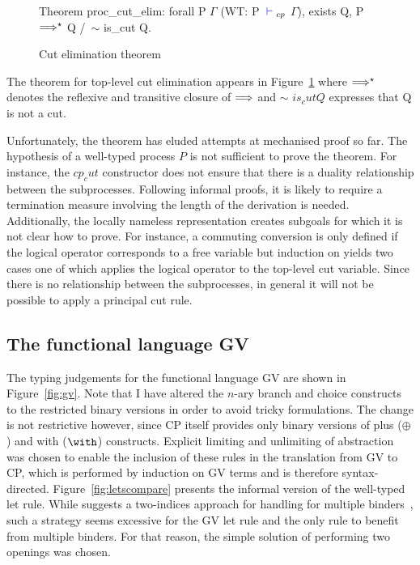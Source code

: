 \begin{figure}
\begin{coq}
Theorem proc_cut_elim:
  forall P $\Gamma$
         (WT: P ${\color{blue} {} \vdash {}}_{cp}$ $\Gamma$),
    exists Q, P $\Longrightarrow^\star$ Q /\ $\sim$ is_cut Q.
\end{coq}
\caption{Cut elimination theorem}
\label{fig:cutelim}
\end{figure}

The theorem for top-level cut elimination appears in Figure~\ref{fig:cutelim}
where $\Longrightarrow^\star$ denotes the reflexive and transitive closure of
$\Longrightarrow$ and $\sim$ \coqe$is_cut Q$ expresses that Q is not a cut.

Unfortunately, the theorem has eluded attempts at mechanised proof so far. The
hypothesis of a well-typed process \coqe$P$ is not sufficient to prove the
theorem. For instance, the \coqe$cp_cut$ constructor does not ensure that
there is a duality relationship between the subprocesses. Following informal
proofs, it is likely to require a termination measure involving the length of
the derivation is needed. Additionally, the locally nameless representation
creates subgoals for which it is not clear how to prove. For instance, a
commuting conversion is only defined if the logical operator corresponds to a
free variable but induction on  yields two cases one of which applies
the logical operator to the top-level cut variable. Since there is no
relationship between the subprocesses, in general it will not be possible to
apply a principal cut rule.

\subsection{The functional language GV}\label{sec:gv}




The typing judgements for the functional language GV are shown in
Figure~\ref{fig:gv}. Note that I have altered the $n$-ary branch and choice
constructs to the restricted binary versions in order to avoid tricky
formulations. The change is not restrictive however, since CP itself provides
only binary versions of plus ($\oplus$) and with ($\with$)
constructs. Explicit limiting and unlimiting of abstraction was chosen to
enable the inclusion of these rules in the translation from GV to CP, which is
performed by induction on GV terms and is therefore
syntax-directed. Figure~\ref{fig:letscompare} presents the informal version of
the well-typed let rule. While \citeauthor{Char:2012} suggests a two-indices
approach for handling for multiple binders~\cite{Char:2012}, such a strategy
seems excessive for the GV let rule and the only rule to benefit from multiple
binders. For that reason, the simple solution of performing two openings was
chosen.


